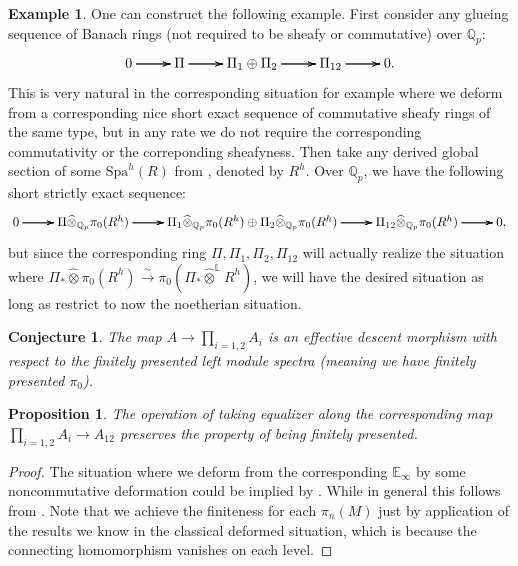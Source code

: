\documentclass[12pt]{amsart}
\newtheorem{proposition}[theorem]{Proposition}
\newtheorem{conjecture}[theorem]{Conjecture}
\theoremstyle{definition}
\numberwithin{equation}{section}
\newtheorem{example}[theorem]{Example}
\begin{document}
\begin{example}
One can construct the following example. First consider any glueing sequence of Banach rings (not required to be sheafy or commutative) over $\mathbb{Q}_p$:
\[
\xymatrix@C+0pc@R+0pc{
0 \ar[r] \ar[r] \ar[r] &\Pi \ar[r] \ar[r] \ar[r] &\Pi_1\oplus \Pi_2  \ar[r] \ar[r] \ar[r] &\Pi_{12} \ar[r] \ar[r] \ar[r] &0.  
}
\]	
This is very natural in the corresponding situation for example where we deform from a corresponding nice short exact sequence of commutative sheafy rings of the same type, but in any rate we do not require the corresponding commutativity or the correponding sheafyness. Then take any derived global section of some $\mathrm{Spa}^h(R)$ from \cite{BK}, denoted by $R^h$. Over $\mathbb{Q}_p$, we have the following short strictly exact sequence:
\[
\xymatrix@C+0pc@R+0pc{
0 \ar[r] \ar[r] \ar[r] &\Pi\widehat{\otimes}_{\mathbb{Q}_p} \pi_0(R^h) \ar[r] \ar[r] \ar[r] &\Pi_1\widehat{\otimes}_{\mathbb{Q}_p} \pi_0(R^h)\oplus \Pi_2\widehat{\otimes}_{\mathbb{Q}_p} \pi_0(R^h)  \ar[r] \ar[r] \ar[r] &\Pi_{12}\widehat{\otimes}_{\mathbb{Q}_p} \pi_0(R^h) \ar[r] \ar[r] \ar[r] &0 ,   
}
\]
but since the corresponding ring $\Pi,\Pi_1,\Pi_2,\Pi_{12}$ will actually realize the situation where $\Pi_*\widehat{\otimes} \pi_0(R^h)\overset{\sim}{\rightarrow}\pi_0(\Pi_*\widehat{\otimes}^\mathbb{L}R^h)$, we will have the desired situation as long as restrict to now the noetherian situation.
\end{example}




\begin{conjecture}
The map $A\rightarrow \prod_{i=1,2} A_i$ is an effective descent morphism with respect to the finitely presented left module spectra (meaning we have finitely presented $\pi_0$).	
\end{conjecture}

\begin{proposition}
The operation of taking equalizer along the corresponding map $\prod_{i=1,2} A_i\rightarrow A_{12}$ preserves the property of being finitely presented.	
\end{proposition}



\begin{proof}
The situation where we deform from the corresponding $\mathbb{E}_\infty$ by some noncommutative deformation could be implied by \cite[Lemma 2.14]{TX2}. While in general this follows from \cite[Lemma 6.83]{TX4}. Note that we achieve the finiteness for each $\pi_n(M)$ just by application of the results we know in the classical deformed situation, which is because the connecting homomorphism vanishes on each level.
\end{proof}
\end{document}

